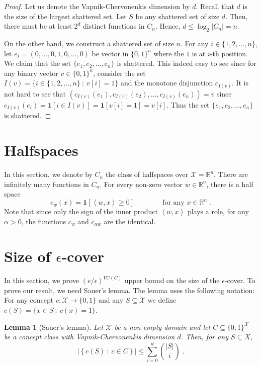 \documentclass[10pt]{article}
\newtheorem{lemma}[proposition]{Lemma}
\newcommand{\R}{\mathbb{R}}
\newcommand{\X}{\mathcal{X}}
\newcommand{\indicator}[1]{\mathbf{1}\left[{#1}\right]}
\newcommand{\ip}[2]{\left\langle #1, #2 \right\rangle}
\begin{document}
\begin{proof}
Let us denote the Vapnik-Chervonenkis dimension by $d$. Recall that $d$ is the
size of the largest shattered set. Let $S$ be any shattered set of size $d$.
Then, there must be at least $2^d$ distinct functions in $C_n$. Hence, $d \le
\log_2 |C_n| = n$.

On the other hand, we construct a shattered set of size $n$. For any $i \in
\{1,2,\dots,n\}$, let $e_i = (0, \dots, 0, 1, 0, \dots, 0)$ be vector in
$\{0,1\}^n$ where the $1$ is at $i$-th position. We claim that the set $\{e_1,
e_2, \dots, e_n\}$ is shattered. This indeed easy to see since for any binary
vector $v \in \{0,1\}^n$, consider the set $I(v) = \{ i \in \{1,2,\dots,n\} ~:~
v[i] = 1 \}$ and the monotone disjunction $c_{I(v)}$. It is not hard to see that
$(c_{I(v)}(e_1), c_{I(v)}(e_2), \dots, c_{I(v)}(e_n)) = v$ since $c_{I(v)}(e_i) =
\indicator{i \in I(v)} = \indicator{v[i] = 1} = v[i]$. Thus the set
$\{e_1, e_2, \dots, e_n\}$ is shattered.
\end{proof}


\section{Halfspaces}

In this section, we denote by $C_n$ the class of halfspaces over $\X = \R^n$. There
are infinitely many functions in $C_n$. For every non-zero vector $w \in \R^n$, there is a half space
$$
c_w(x) = \indicator{\ip{w}{x} \ge 0} \qquad \qquad \text{for any $x \in \R^n$} \; .
$$
Note that since only the sign of the inner product $\ip{w}{x}$ plays a role, for
any $\alpha > 0$, the functions $c_w$ and $c_{\alpha w}$ are the identical.




\appendix

\section{Size of $\epsilon$-cover}
\label{section:epsilon-cover}

In this section, we prove $(e/\epsilon)^{VC(C)}$ upper bound on the size of the
$\epsilon$-cover. To prove our result, we need Sauer's lemma. The lemma
uses the following notation: For any concept $c:\X \to \{0,1\}$ and
any $S \subseteq \X$ we define $c(S) = \{x \in S ~:~ c(x) = 1 \}$.

\begin{lemma}[Sauer's lemma]
Let $\X$ be a non-empty domain and let $C \subseteq \{0,1\}^\X$ be a concept class
with Vapnik-Chervonenkis dimension $d$. Then, for any $S \subseteq X$,
$$
\left| \left\{ c(S) ~:~ c \in C \right\} \right| \le \sum_{i=0}^d \binom{|S|}{i} \; .
$$
\end{lemma}
\end{document}
